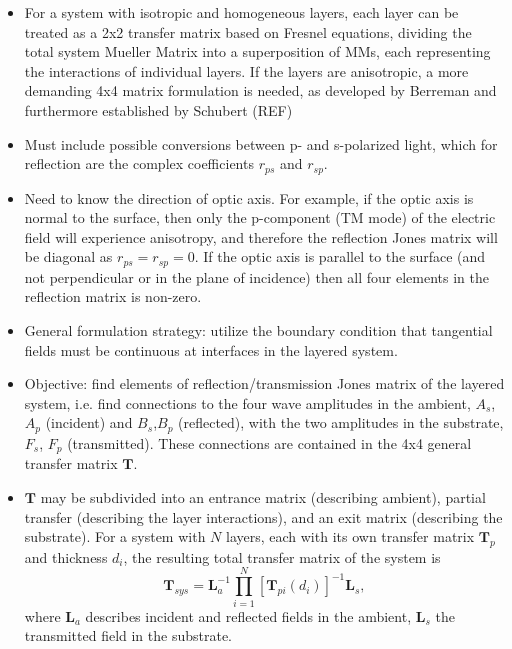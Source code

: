 \begin{itemize}
    \item For a system with isotropic and homogeneous layers, each layer can be treated as a 2x2 transfer matrix based on Fresnel equations, dividing the total system Mueller Matrix into a superposition of MMs, each representing the interactions of individual layers. If the layers are anisotropic, a more demanding 4x4 matrix formulation is needed, as developed by Berreman and furthermore established by Schubert (REF)
    
    \item Must include possible conversions between p- and s-polarized light, which for reflection are the complex coefficients $r_{ps}$ and $r_{sp}$.
    
    \item Need to know the direction of optic axis. For example, if the optic axis is normal to the surface, then only the p-component (TM mode) of the electric field will experience anisotropy, and therefore the reflection Jones matrix will be diagonal as $r_{ps} = r_{sp} = 0$. If the optic axis is parallel to the surface (and not perpendicular or in the plane of incidence) then all four elements in the reflection matrix is non-zero.
    
    \item General formulation strategy: utilize the boundary condition that tangential fields must be continuous at interfaces in the layered system.

    \item Objective: find elements of reflection/transmission Jones matrix of the layered system, i.e. find connections to the four wave amplitudes in the ambient, $A_s$,$A_p$ (incident) and $B_s$,$B_p$ (reflected), with the two amplitudes in the substrate, $F_s$, $F_p$ (transmitted). These connections are contained in the 4x4 general transfer matrix $\mathbf{T}$.
    
    \item $\mathbf{T}$ may be subdivided into an entrance matrix (describing ambient), partial transfer (describing the layer interactions), and an exit matrix (describing the substrate). For a system with $N$ layers, each with its own transfer matrix $\mathbf{T}_p$ and thickness $d_i$, the resulting total transfer matrix of the system is
    \begin{equation}
        \mathbf{T}_{sys} = \mathbf{L}_a^{-1} \prod_{i=1}^N [\mathbf{T}_{pi}(d_i)]^{-1} \mathbf{L}_s,
        \label{eq:general_transfer_matrix}
    \end{equation}
    where $\mathbf{L}_a$ describes incident and reflected fields in the ambient, $\mathbf{L}_s$ the transmitted field in the substrate.
    

\end{itemize}
